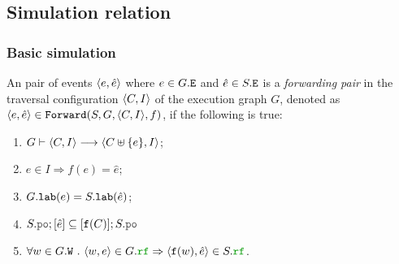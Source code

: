 \documentclass[12pt]{article}
\begin{document}
\subsection{Simulation relation}

\subsubsection{Basic simulation}

\begin{definition}
  An pair of events $\langle e, \hat{e} \rangle$ where $e \in G.{\mathtt{E}}$ and $\hat{e} \in S.{\mathtt{E}}$
  is a \emph{forwarding pair} in
  the traversal configuration $\langle C, I \rangle$ of the \imm execution graph $G$,
  denoted as $\langle e, \hat{e} \rangle \in {\mathtt{Forward}}(S, G, \langle C, I \rangle, f)$, if the following is true:
  \begin{enumerate}[label=\textbf{F.\arabic*}]

    \item \label{item:frwd-coverable}
      $G \vdash \langle C, I \rangle \longrightarrow \langle C \uplus \{e\}, I \rangle$;
    
    \item \label{item:frwd-issued}
      $e \in I \Rightarrow f(e) = \hat{e}$;

    \item \label{item:frwd-lab}
      $G.{\mathtt{lab}}(e) = S.{\mathtt{lab}}(\hat{e})$;

    \item \label{item:frwd-front}
      $S.\lPO;[\hat{e}] \subseteq [\f(C)];S.\lPO$

    \item \label{item:frwd-rf}
      $\forall{w \in G.\lW} ~.~ \tup{w, e} \in G.\lRF \Rightarrow \tup{\f(w), \hat{e}} \in S.\lRF$.

  \end{enumerate}
\end{definition}
\end{document}
